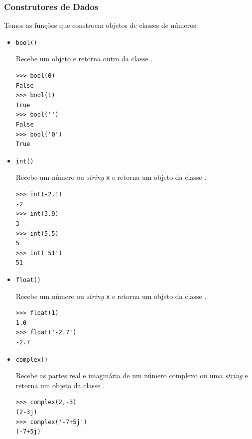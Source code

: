 \subsubsection{Construtores de Dados}

Temos as funções que constroem objetos de classes de números:
\begin{itemize}

\item \lstinline+bool()+ 

  Recebe um objeto e retorna outro da classe {\PYTHONbool}.

\begin{lstlisting}[xrightmargin=2.5em]
>>> bool(0)
False
>>> bool(1)
True
>>> bool('')
False
>>> bool('0')
True
\end{lstlisting}
  
\item \lstinline+int()+ 

  Recebe um número ou \textit{string} \lstinline+x+ e retorna um objeto da classe {\PYTHONint}.

\begin{lstlisting}[xrightmargin=2.5em]
>>> int(-2.1)
-2
>>> int(3.9)
3
>>> int(5.5)
5
>>> int('51')
51
\end{lstlisting}

\item \lstinline+float()+ 

  Recebe um número ou \textit{string} \lstinline+x+ e retorna um objeto da classe {\PYTHONfloat}.

\begin{lstlisting}[xrightmargin=2.5em]
>>> float(1)
1.0
>>> float('-2.7')
-2.7
\end{lstlisting}

\item \lstinline+complex()+ 

  Recebe as partes real e imaginária de um número complexo ou uma \textit{string} e retorna um objeto da classe {\PYTHONcomplex}.

\begin{lstlisting}[xrightmargin=2.5em]
>>> complex(2,-3)
(2-3j)
>>> complex('-7+5j')
(-7+5j)
\end{lstlisting}

\end{itemize}

